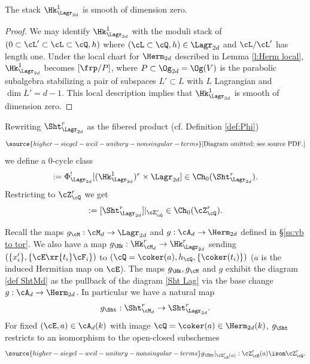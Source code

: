\begin{lemma}
\notready
The stack $\Hk^{1}_{\Lagr_{2d}}$ is smooth of dimension zero.
\end{lemma}
\begin{proof}
We may identify $\Hk^{1}_{\Lagr_{2d}}$ with the moduli stack of $(0\subset \cL'\subset \cL\subset \cQ, h)$ where $(\cL\subset\cQ,h)\in\Lagr_{2d}$ and $\cL/\cL'$ has length one. Under the local chart for $\Herm_{2d}$ described in Lemma \ref{l:Herm local}, $\Hk^{1}_{\Lagr_{2d}}$ becomes $[\frp/P]$, where $P\subset \Og_{2d}=\Og(V)$ is the parabolic subalgebra stabilizing a pair of subspaces  $L'\subset L$ with $L$ Lagrangian and $\dim L'=d-1$. This local description implies that $\Hk^{1}_{\Lagr_{2d}}$ is smooth of dimension zero.
\end{proof}

Rewriting $\Sht^{r}_{\Lagr_{2d}}$ as the fibered product (cf. Definition \ref{def:Phi})
\begin{equation}\label{Sht Lagr}
\source{higher-siegel-weil-unitary-nonsingular-terms}
\text{[Diagram omitted; see source PDF.]}
\end{equation}
we define a $0$-cycle class
\begin{equation}
[\Sht^{r}_{\Lagr_{2d}}]:=\Phi_{\Lagr_{2d}}^{!}[(\Hk^{1}_{\Lagr_{2d}})^{r} \times \Lagr_{2d}]\in \Ch_{0}(\Sht^{r}_{\Lagr_{2d}}).
\end{equation}
Restricting to $\cZ^{r}_{\cQ}$ we get
\begin{equation}
[\cZ^{r}_{\cQ}]:=[\Sht^{r}_{\Lagr_{2d}}]|_{\cZ^{r}_{\cQ}}\in \Ch_{0}(\cZ^{r}_{\cQ}).
\end{equation}

Recall the maps $g_{\cM}: \cM_{d}\to \Lagr_{2d}$ and $g:\cA_{d}\to \Herm_{2d}$ defined in \S\ref{ss:vb to tor}. We also have a map  $g_{\Hk}: \Hk^{r}_{\cM_{d}}\to \Hk^{r}_{\Lagr_{2d}}$ sending $(\{x'_{i}\} , \{\cE\xr{t_{i}}\cF_{i}\})$ to $(\cQ=\coker(a), h_{\cQ}, \{\coker(t_{i})\})$ ($a$ is the induced Hermitian map on $\cE$).   The maps $g_{\Hk}, g_{\cM}$ and $g$ exhibit the diagram \eqref{def ShtMd} as the pullback of the diagram \eqref{Sht Lag} via the base change $g: \cA_{d}\to\Herm_{2d}$.  In particular we have a natural map
\begin{equation}
g_{\Sht}: \Sht^{r}_{\cM_{d}}\to \Sht^{r}_{\Lagr_{2d}}.
\end{equation}
For fixed $(\cE,a)\in \cA_{d}(k)$ with image $\cQ=\coker(a)\in \Herm_{2d}(k)$, $g_{\Sht}$ restricts to an isomorphism to the open-closed subschemes
\begin{equation}\label{gSht}
\source{higher-siegel-weil-unitary-nonsingular-terms}
g_{\Sht}|_{\cZ^{r}_{\cE}(a)}: \cZ^{r}_{\cE}(a)\isom \cZ^{r}_{\cQ}.
\end{equation}


